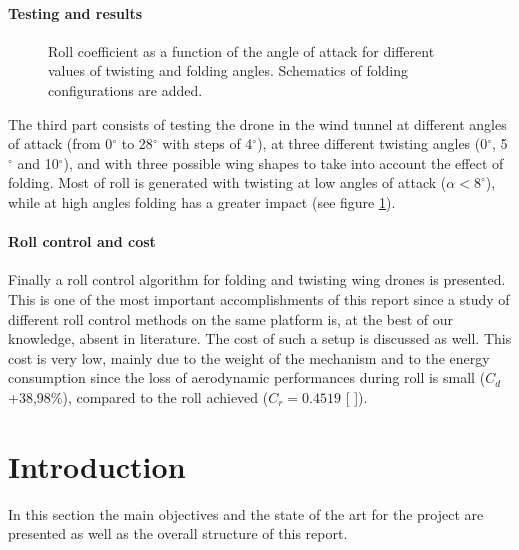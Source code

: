 \documentclass[12pt,a4paper]{article}
\begin{document}
\begin{multicols}{2}
\paragraph{Testing and results}
\begin{figure}[H]
	\centering
	\caption{Roll coefficient as a function of the angle of attack for different values of twisting and folding angles. Schematics of folding configurations are added. }\label{fig:tw_vs_fold_bar}
\end{figure}
The third part consists of testing the drone in the wind tunnel at different angles of attack (from 0$^\circ$ to 28$^\circ$ with steps of 4$^\circ$), at three different twisting angles (0$^\circ$, 5$^\circ$ and 10$^\circ$), and with three possible wing shapes to take into account the effect of folding. Most of roll is generated with twisting at low angles of attack ($\alpha<8^\circ$), while at high angles folding has a greater impact (see figure \ref{fig:tw_vs_fold_bar}).
\paragraph{Roll control and cost}
Finally a roll control algorithm for folding and twisting wing drones is presented.  This is one of the most important accomplishments of this report since a study of different roll control methods on the same platform is, at the best of our knowledge, absent in literature. The cost of such a setup is discussed as well. This cost is very low, mainly due to the weight of the mechanism and to the energy consumption since the loss of aerodynamic performances during roll is small ($C_d$ +38,98\%), compared to the roll achieved ($C_r = 0.4519$ [ ]).

\end{multicols}

\clearpage
\lfoot{ }
\rfoot{ }
\chead{ }


\pagestyle{plain}
\clearpage

\tableofcontents
\clearpage
\pagestyle{fancy}
\section{Introduction}\label{sec:intro}
In this section the main objectives and the state of the art for the project are presented as well as the overall structure of this report.
\end{document}
